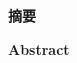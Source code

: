 \cleardoublepage{}
\begin{center}
    \bfseries {} 摘要
\end{center}


\cleardoublepage{}
\begin{center}
    \bfseries {} Abstract
\end{center}
